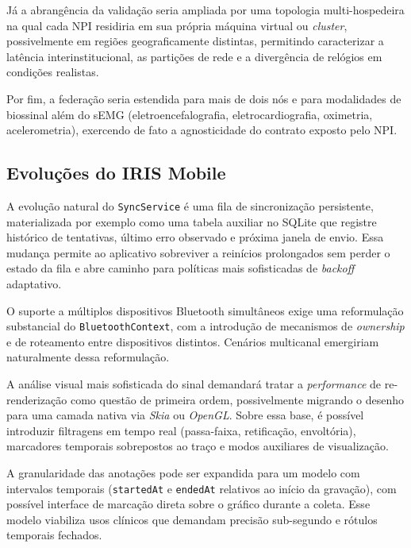 Já a abrangência da validação seria ampliada por uma topologia multi-hospedeira na qual cada NPI residiria em sua própria máquina virtual ou \textit{cluster}, possivelmente em regiões geograficamente distintas, permitindo caracterizar a latência interinstitucional, as partições de rede e a divergência de relógios em condições realistas.

Por fim, a federação seria estendida para mais de dois nós e para modalidades de biossinal além do sEMG (eletroencefalografia, eletrocardiografia, oximetria, acelerometria), exercendo de fato a agnosticidade do contrato exposto pelo NPI.

\subsection{Evoluções do IRIS Mobile}\label{subsec:trabalhosFuturosIrisMobile}


A evolução natural do \texttt{SyncService} é uma fila de sincronização persistente, materializada por exemplo como uma tabela auxiliar no SQLite que registre histórico de tentativas, último erro observado e próxima janela de envio. Essa mudança permite ao aplicativo sobreviver a reinícios prolongados sem perder o estado da fila e abre caminho para políticas mais sofisticadas de \textit{backoff} adaptativo.

O suporte a múltiplos dispositivos Bluetooth simultâneos exige uma reformulação substancial do \texttt{BluetoothContext}, com a introdução de mecanismos de \textit{ownership} e de roteamento entre dispositivos distintos. Cenários multicanal emergiriam naturalmente dessa reformulação.

A análise visual mais sofisticada do sinal demandará tratar a \textit{performance} de re-renderização como questão de primeira ordem, possivelmente migrando o desenho para uma camada nativa via \textit{Skia} ou \textit{OpenGL}. Sobre essa base, é possível introduzir filtragens em tempo real (passa-faixa, retificação, envoltória), marcadores temporais sobrepostos ao traço e modos auxiliares de visualização.

A granularidade das anotações pode ser expandida para um modelo com intervalos temporais (\texttt{startedAt} e \texttt{endedAt} relativos ao início da gravação), com possível interface de marcação direta sobre o gráfico durante a coleta. Esse modelo viabiliza usos clínicos que demandam precisão sub-segundo e rótulos temporais fechados.

